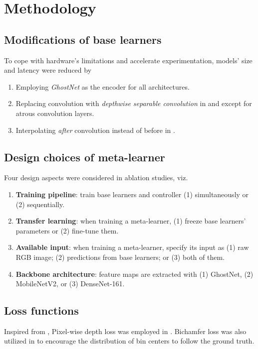 \documentclass[conference]{IEEEtran}
\begin{document}
\section{Methodology}
\subsection{Modifications of base learners}
To cope with hardware's limitations and accelerate experimentation, models' size and latency were reduced by
\begin{enumerate}
    \item Employing \textit{GhostNet} as the encoder for all architectures.
    \item Replacing convolution with \textit{depthwise separable convolution} in \cite{adabins} and \cite{bts} except for atrous convolution layers.
    \item Interpolating \textit{after} convolution instead of before in \cite{adabins}.
\end{enumerate}

\subsection{Design choices of meta-learner}
Four design aspects were considered in ablation studies, viz.
\begin{enumerate}
    \item \textbf{Training pipeline}: train base learners and controller (1) simultaneously or (2) sequentially.
    \item \textbf{Transfer learning}: when training a meta-learner, (1) freeze base learners' parameters or (2) fine-tune them.
    \item \textbf{Available input}: when training a meta-learner, specify its input as (1) raw RGB image; (2) predictions from base learners; or (3) both of them.
    \item \textbf{Backbone architecture}: feature maps are extracted with (1) GhostNet, (2) MobileNetV2, or (3) DenseNet-161.
\end{enumerate}

\subsection{Loss functions}
Inspired from \cite{adabins}, Pixel-wise depth loss was employed in \cite{adabins, bts, lapdepth}. Bichamfer loss was also utilized in \cite{adabins} to encourage the distribution of bin centers to follow the ground truth.
\end{document}
